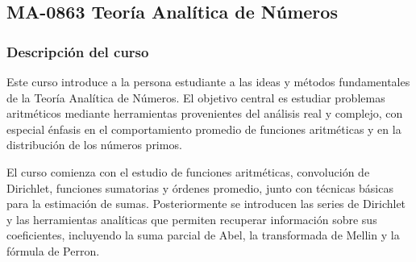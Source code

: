 \newpage
\subsection*{MA-0863 Teoría Analítica de Números}

\hypertarget{MA0863}{}
\begin{refsection}
\begin{table}[H]
\end{table}

\subsubsection*{Descripción del curso}

Este curso introduce a la persona estudiante a las ideas y métodos fundamentales de la Teoría Analítica de Números. El objetivo central es estudiar problemas aritméticos mediante herramientas provenientes del análisis real y complejo, con especial énfasis en el comportamiento promedio de funciones aritméticas y en la distribución de los números primos.

El curso comienza con el estudio de funciones aritméticas, convolución de Dirichlet, funciones sumatorias y órdenes promedio, junto con técnicas básicas para la estimación de sumas. Posteriormente se introducen las series de Dirichlet y las herramientas analíticas que permiten recuperar información sobre sus coeficientes, incluyendo la suma parcial de Abel, la transformada de Mellin y la fórmula de Perron.


\end{refsection}
